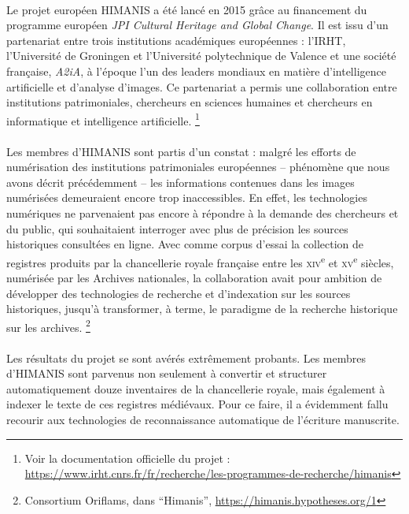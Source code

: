 \documentclass[a4paper,12pt,twoside]{book}
\begin{document}
\paragraph{}
Le projet européen HIMANIS a été lancé en 2015 grâce au financement du programme européen \textit{JPI Cultural Heritage and Global Change}. Il est issu d’un partenariat entre trois institutions académiques européennes : l’IRHT, l’Université de Groningen et l’Université polytechnique de Valence et une société française, \textit{A2iA}, à l’époque l’un des leaders mondiaux en matière d’intelligence artificielle et d’analyse d’images. Ce partenariat a permis une collaboration entre institutions patrimoniales, chercheurs en sciences humaines et chercheurs en informatique et intelligence artificielle. \footnote{Voir la documentation officielle du projet : \url{https://www.irht.cnrs.fr/fr/recherche/les-programmes-de-recherche/himanis}}

\paragraph{}
Les membres d’HIMANIS sont partis d’un constat : malgré les efforts de numérisation des institutions patrimoniales européennes – phénomène que nous avons décrit précédemment – les informations contenues dans les images numérisées demeuraient encore trop inaccessibles. En effet, les technologies numériques ne parvenaient pas encore à répondre à la demande des chercheurs et du public, qui souhaitaient interroger avec plus de précision les sources historiques consultées en ligne. Avec comme corpus d’essai la collection de registres produits par la chancellerie royale française entre les \textsc{xiv}\textsuperscript{e} et \textsc{xv}\textsuperscript{e} siècles, numérisée par les Archives nationales, la collaboration avait pour ambition de développer des technologies de recherche et d’indexation sur les sources historiques, jusqu’à transformer, à terme, le paradigme de la recherche historique sur les archives. \footnote{Consortium Oriflams, dans \enquote{Himanis},  \url{https://himanis.hypotheses.org/1}}

\paragraph{}
Les résultats du projet se sont avérés extrêmement probants. Les membres d’HIMANIS sont parvenus non seulement à convertir et structurer automatiquement douze inventaires de la chancellerie royale, mais également à indexer le texte de ces registres médiévaux. Pour ce faire, il a évidemment fallu recourir aux technologies de reconnaissance automatique de l’écriture manuscrite. 
\end{document}
